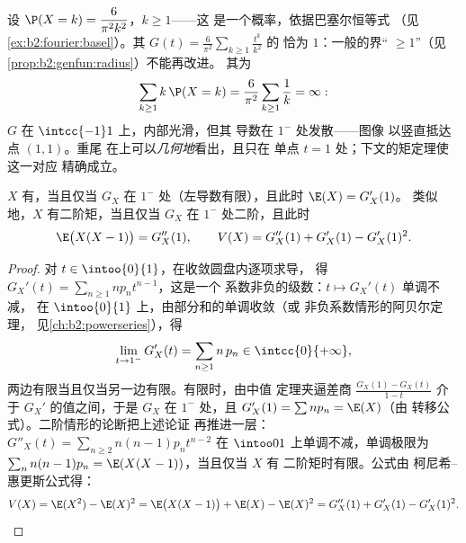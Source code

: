 \begin{example}\label{ex:b2:genfun:heavytail}
设 $\P(X = k) = \dfrac{6}{\pi^2k^2}$，$k \geq 1$——这
是一个概率，依据巴塞尔恒等式
（见\cref{ex:b2:fourier:basel}）。其
$G(t) = \frac6{\pi^2}\sum_{k\geq1}\frac{t^k}{k^2}$ 的
恰为 $1$：一般的界“ $\geq
1$”（见\cref{prop:b2:genfun:radius}）不能再改进。
其为
\[
\sum_{k\geq1}k\,\P(X = k) =
\frac6{\pi^2}\sum_{k\geq1}\frac1k = \infty :
\]
$G$ 在 $\intcc{-1}1$ 上，内部光滑，但其
导数在 $1^-$ 处发散——图像
以竖直抵达点 $(1, 1)$。重尾
在上可以\emph{几何地}看出，且只在
单点 $t = 1$ 处；下文的矩定理使这一对应
精确成立。
\end{example}

\begin{theorem}[由母函数
求矩]\label{thm:b2:genfun:moments}
$X$ 有，当且仅当 $G_X$ 在 $1^-$
处（左导数有限），且此时 $\E(X) = G_X'(1)$。
类似地，$X$ 有二阶矩，当且仅当 $G_X$
在 $1^-$ 处二阶，且此时
\[
\E\bigl(X(X - 1)\bigr) = G_X''(1),
\qquad
V(X) = G_X''(1) + G_X'(1) - G_X'(1)^2 .
\]
\end{theorem}

\begin{proof}
对 $t \in \intoo{0}{1}$，在收敛圆盘内逐项求导，
得 $G_X'(t) = \sum_{n\geq1} np_n t^{n-1}$，这是一个
系数非负的级数：$t \mapsto G_X'(t)$ 单调不减，
在 $\intoo{0}{1}$ 上，由部分和的单调收敛（或
非负系数情形的阿贝尔定理，
见\cref{ch:b2:powerseries}），得
\[
\lim_{t \to 1^-} G_X'(t)
= \sum_{n\geq1} n\,p_n \in \intcc{0}{+\infty} ,
\]
两边有限当且仅当另一边有限。有限时，由中值
定理夹逼差商 $\frac{G_X(1) -
G_X(t)}{1 - t}$ 介于 $G_X'$ 的值之间，于是 $G_X$
在 $1^-$ 处，且 $G_X'(1) = \sum np_n = \E(X)$（由
转移公式）。二阶情形的论断把上述论证
再推进一层：$G''_X(t) = \sum_{n\geq2}n(n-1)p_nt^{n-2}$ 在
$\intoo01$ 上单调不减，单调极限为
$\sum_nn(n-1)p_n = \E(X(X-1))$，当且仅当 $X$ 有
二阶矩时有限。公式由
柯尼希–惠更斯公式得：
\[
V(X) = \E(X^2) - \E(X)^2 = \E\bigl(X(X-1)\bigr) + \E(X) -
\E(X)^2 = G''_X(1) + G'_X(1) - G'_X(1)^2 .
\]
\end{proof}

